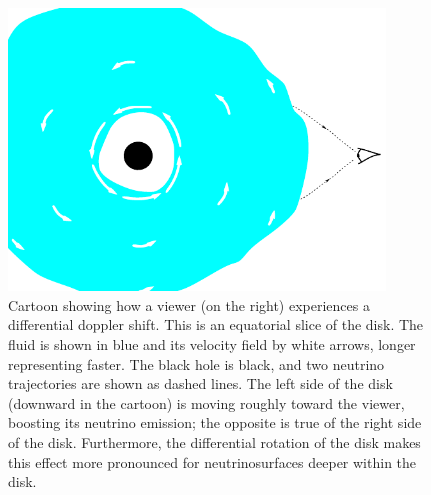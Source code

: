 \begin{figure}
  \centering
  \includegraphics[width=10cm]{Figures/seeing_disk_doppler_shift}
  \caption[Cartoon of the doppler shift due to disk rotation]{
    Cartoon showing how a viewer (on the right) experiences a differential
    doppler shift. This is an equatorial slice of the disk.
    The fluid is shown in blue and its velocity field by white arrows, longer
    representing faster. The black hole is black, and two neutrino trajectories
    are shown as dashed lines. The left side of the disk (downward in the
    cartoon) is moving roughly toward the viewer, boosting its neutrino emission;
    the opposite is true of the right side of the disk.
    Furthermore, the differential rotation of the disk makes this effect more
    pronounced for neutrinosurfaces deeper within the disk.
  }
  \label{fig:schematic_ray_doppler}
\end{figure}

